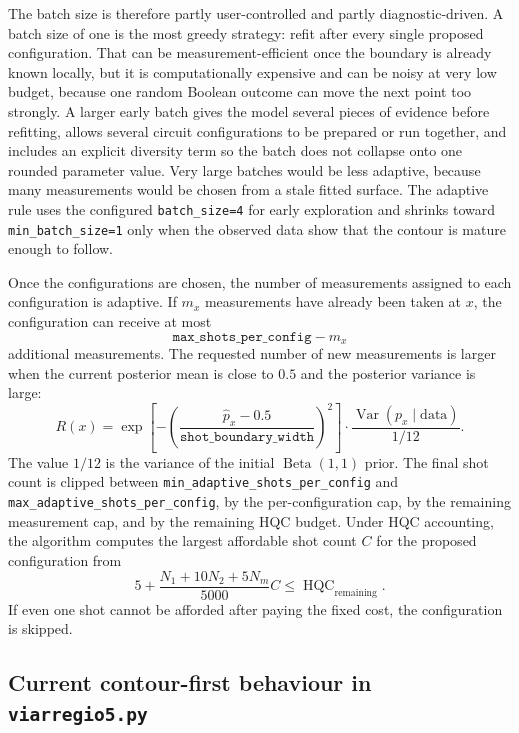 The batch size is therefore partly user-controlled and partly diagnostic-driven.
A batch size of one is the most greedy strategy: refit after every single
proposed configuration.  That can be measurement-efficient once the boundary is
already known locally, but it is computationally expensive and can be noisy at
very low budget, because one random Boolean outcome can move the next point too
strongly.  A larger early batch gives the model several pieces of evidence
before refitting, allows several circuit configurations to be prepared or run
together, and includes an explicit diversity term so the batch does not collapse
onto one rounded parameter value.  Very large batches would be less adaptive,
because many measurements would be chosen from a stale fitted surface.  The
adaptive rule uses the configured \texttt{batch\_size=4} for early exploration
and shrinks toward \texttt{min\_batch\_size=1} only when the observed data show
that the contour is mature enough to follow.

Once the configurations are chosen, the number of measurements assigned to each
configuration is adaptive.  If \(m_x\) measurements have already been taken at
\(x\), the configuration can receive at most
\[
    \texttt{max\_shots\_per\_config} - m_x
\]
additional measurements.  The requested number of new measurements is larger
when the current posterior mean is close to \(0.5\) and the posterior variance
is large:
\[
    R(x)
    =
    \exp\!\left[
        -\left(
            \frac{\widehat p_x-0.5}
                 {\texttt{shot\_boundary\_width}}
        \right)^2
    \right]
    \cdot
    \frac{\operatorname{Var}(p_x \mid \mathrm{data})}{1/12}.
\]
The value \(1/12\) is the variance of the initial
\(\operatorname{Beta}(1,1)\) prior.  The final shot count is clipped between
\texttt{min\_adaptive\_shots\_per\_config} and
\texttt{max\_adaptive\_shots\_per\_config}, by the per-configuration cap, by
the remaining measurement cap, and by the remaining HQC budget.  Under HQC
accounting, the algorithm computes the largest affordable shot count \(C\) for
the proposed configuration from
\[
    5
    +
    \frac{N_1 + 10N_2 + 5N_m}{5000} C
    \leq
    \operatorname{HQC}_{\mathrm{remaining}}.
\]
If even one shot cannot be afforded after paying the fixed cost, the
configuration is skipped.

\subsection{Current contour-first behaviour in \texttt{viarregio5.py}}

